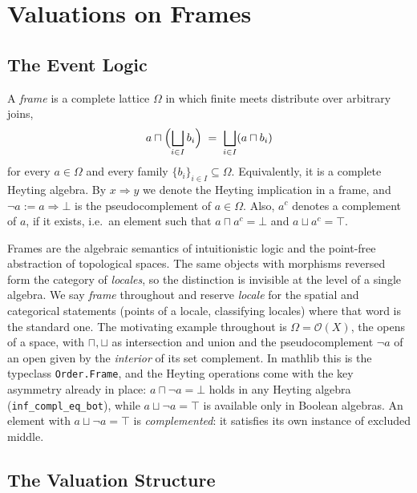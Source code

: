 \section{Valuations on Frames}
\label{sec:valuation}

\subsection{The Event Logic}

\begin{definition}[frame]
\label{def:frame}
A \emph{frame} is a complete lattice $\Omega$ in which finite meets
distribute over arbitrary joins,
\[
  a \sqcap \Bigl(\bigsqcup_{i \in I} b_i\Bigr)
  \;=\; \bigsqcup_{i \in I} (a \sqcap b_i)
\]
for every $a \in \Omega$ and every family $\{b_i\}_{i \in I}
\subseteq \Omega$.  Equivalently, it is a complete Heyting algebra.
By $x \Rightarrow y$ we denote the Heyting implication in a frame,
and $\neg a := a \Rightarrow \bot$ is the pseudocomplement of
$a \in \Omega$.  Also, $a^{c}$ denotes a complement of $a$, if it
exists, i.e.\ an element such that $a \sqcap a^{c} = \bot$ and
$a \sqcup a^{c} = \top$.
\end{definition}

\noindent
Frames are the algebraic semantics of
intuitionistic logic and the point-free abstraction of topological
spaces.  The same objects with morphisms reversed form the category
of \emph{locales}, so the distinction is invisible at the level of
a single algebra.  We say \emph{frame} throughout and reserve
\emph{locale} for the spatial and categorical statements (points of
a locale, classifying locales) where that word is the standard one.  The motivating example throughout is
$\Omega = \mathcal{O}(X)$, the opens of a space, with
$\sqcap, \sqcup$ as intersection and union and the pseudocomplement
$\neg a$ of an open given by the \emph{interior} of its set
complement.  In \textsf{mathlib} this is the typeclass
\texttt{Order.Frame}, and the Heyting operations come with the key
asymmetry already in place: $a \sqcap \neg a = \bot$ holds in
any Heyting algebra (\texttt{inf\_compl\_eq\_bot}), while
$a \sqcup \neg a = \top$ is available only in Boolean
algebras.  An element with $a \sqcup \neg a = \top$ is
\emph{complemented}: it satisfies its own instance of excluded
middle.

\subsection{The Valuation Structure}

